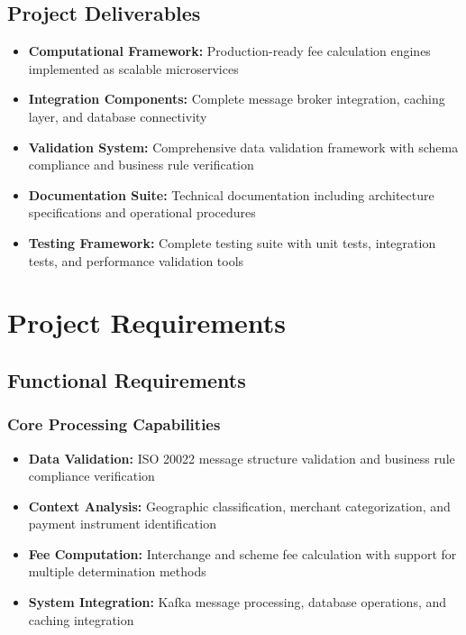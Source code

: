 \subsection{Project Deliverables}

\begin{itemize}
    \item \textbf{Computational Framework:} Production-ready fee calculation engines implemented as scalable microservices
    \item \textbf{Integration Components:} Complete message broker integration, caching layer, and database connectivity
    \item \textbf{Validation System:} Comprehensive data validation framework with schema compliance and business rule verification
    \item \textbf{Documentation Suite:} Technical documentation including architecture specifications and operational procedures
    \item \textbf{Testing Framework:} Complete testing suite with unit tests, integration tests, and performance validation tools
\end{itemize}

\section{Project Requirements}

\subsection{Functional Requirements}

\subsubsection{Core Processing Capabilities}
\begin{itemize}
    \item \textbf{Data Validation:} ISO 20022 message structure validation and business rule compliance verification
    \item \textbf{Context Analysis:} Geographic classification, merchant categorization, and payment instrument identification
    \item \textbf{Fee Computation:} Interchange and scheme fee calculation with support for multiple determination methods
    \item \textbf{System Integration:} Kafka message processing, database operations, and caching integration
\end{itemize}

